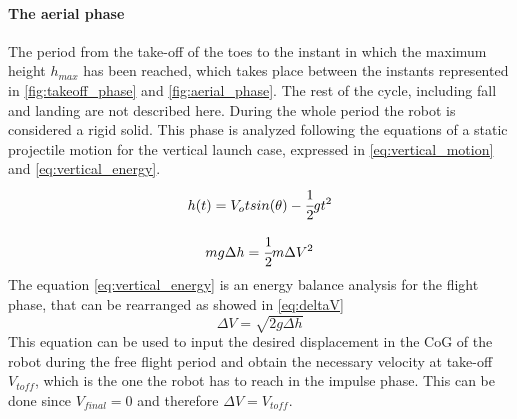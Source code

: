 \paragraph{The aerial phase}
The period from the take-off of the toes to the instant in which the maximum height $h_{max}$ has been reached, which takes place between the instants represented in \ref{fig:takeoff_phase} and \ref{fig:aerial_phase}. 
The rest of the cycle, including fall and landing are not described here.
During the whole period the robot is considered a rigid solid.
This phase is analyzed following the equations of a static projectile motion for the vertical launch case, expressed in \ref{eq:vertical_motion} and \ref{eq:vertical_energy}.
\begin{equation}
\label{eq:vertical_motion}	
	h(t) = V_o t sin(\theta) - \cfrac{1}{2} g t^2 
\end{equation}

\begin{equation}
\label{eq:vertical_energy}
	m g \Delta h = \cfrac{1}{2} m \Delta V^2
\end{equation}
The equation \ref{eq:vertical_energy} is an energy balance analysis for the flight phase, that can be rearranged as showed in \ref{eq:deltaV}
\begin{equation}
\label{eq:deltaV}
	\Delta V = \sqrt{2 g \Delta h}
\end{equation}
This equation can be used to input the desired displacement in the CoG of the robot during the free flight period and obtain the necessary velocity at take-off $V_{toff}$, which is the one the robot has to reach in the impulse phase.
This can be done since $V_{final} = 0$ and therefore $\Delta V = V_{toff}$.

